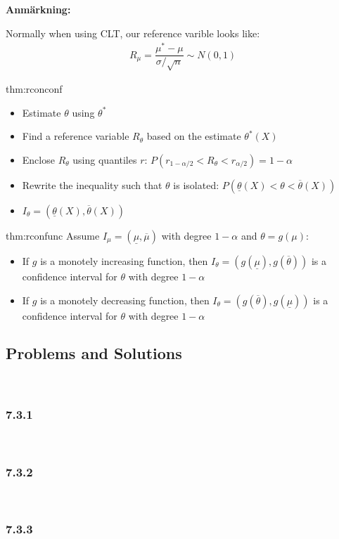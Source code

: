 \par\bigskip
\noindent\textbf{Anmärkning:}\par
\noindent Normally when using CLT, our reference varible looks like:
\begin{equation*}
  \begin{gathered}
    R_\mu = \dfrac{\mu^*-\mu}{\sigma/\sqrt{n}}\sim N(0,1)
  \end{gathered}
\end{equation*}
\par\bigskip
\begin{theo}{thm:rconconf}
  \begin{itemize}
    \item Estimate $\theta$ using $\theta^*$
    \item Find a reference variable $R_\theta$ based on the estimate $\theta^*(X)$
    \item Enclose $R_\theta$ using quantiles $r$: $P(r_{1-\alpha/2}<R_\theta<r_{\alpha/2}) = 1-\alpha$
    \item Rewrite the inequality such that $\theta$ is isolated: $P(\underline{\theta}(X)<\theta<\overline{\theta}(X))$
    \item $I_\theta = (\underline{\theta}(X),\overline{\theta}(X))$
  \end{itemize}
\end{theo}
\par\bigskip
\begin{theo}[Confidence interval for function $\theta = g(\mu)$]{thm:rconfunc}
  Assume $I_\mu = (\underline{\mu},\overline{\mu})$ with degree $1-\alpha$ and $\theta = g(\mu)$:\par
  \begin{itemize}
    \item If $g$ is a monotely increasing function, then $I_\theta = (g(\underline{\mu}), g(\overline{\theta}))$ is a confidence interval for $\theta$ with degree $1-\alpha$
      \par\bigskip
    \item If $g$ is a monotely decreasing function, then $I_\theta = (g(\overline{\theta}), g(\underline{\mu}))$ is a confidence interval for $\theta$ with degree $1-\alpha$
  \end{itemize}
\end{theo}
\par\bigskip
\subsection{Problems and Solutions}\hfill\\\par
\subsubsection{7.3.1}\hfill\\
\par\bigskip
\subsubsection{7.3.2}\hfill\\
\par\bigskip
\subsubsection{7.3.3}\hfill\\
